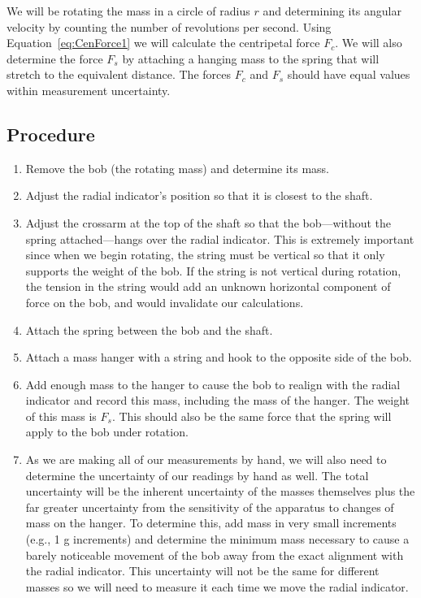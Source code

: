 \documentclass[main.tex]{subfiles}
\begin{document}
We will be rotating the mass in a circle of radius $r$ and determining its angular velocity by counting the number of revolutions per second. Using Equation~\eqref{eq:CenForce1} we will calculate the centripetal force $F_c.$ We will also determine the force $F_s$ by attaching a hanging mass to the spring that will stretch to the equivalent distance. The forces $F_c$ and $F_s$ should have equal values within measurement uncertainty.

\subsection*{Procedure}
\begin{enumerate}
\item
Remove the bob (the rotating mass) and determine its mass.
\item
Adjust the radial indicator's position so that it is closest to the shaft.
\item \label{step:CenForce1_start}
Adjust the crossarm at the top of the shaft so that the bob---without the spring attached---hangs over the radial indicator. This is extremely important since when we begin rotating, the string must be vertical so that it only supports the weight of the bob. If the string is not vertical during rotation, the tension in the string would add an unknown horizontal component of force on the bob, and would invalidate our calculations.
\item
Attach the spring between the bob and the shaft.
\item
Attach a mass hanger with a string and hook to the opposite side of the bob.
\item
Add enough mass to the hanger to cause the bob to realign with the radial indicator and record this mass, including the mass of the hanger. The weight of this mass is $F_s.$ This should also be the same force that the spring will apply to the bob under rotation.
\item
As we are making all of our measurements by hand, we will also need to determine the uncertainty of our readings by hand as well. The total uncertainty will be the inherent uncertainty of the masses themselves plus the far greater uncertainty from the sensitivity of the apparatus to changes of mass on the hanger. To determine this, add mass in very small increments (e.g., 1 g increments) and determine the minimum mass necessary to cause a barely noticeable movement of the bob away from the exact alignment with the radial indicator. This uncertainty will not be the same for different masses so we will need to measure it each time we move the radial indicator.

\end{enumerate}
\end{document}
